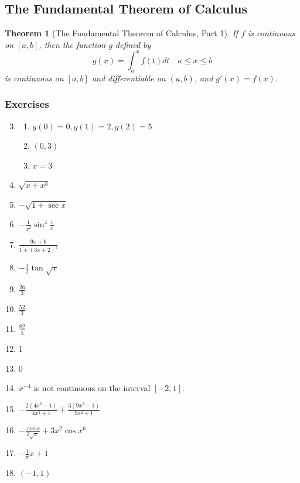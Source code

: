 \documentclass{article} \usepackage[margin=1in]{geometry}
\newtheorem*{theorem*}{Theorem}
\begin{document}
\subsection{The Fundamental Theorem of Calculus}
\begin{theorem*}[The Fundamental Theorem of Calculus, Part 1]
	If $f$ is continuous on $[a, b]$, then the function $g$ defined by
	\[g(x)=\int_{a}^{x}f(t)dt \hspace{1em} a\le x\le b\] is continuous
	on $[a, b]$ and differentiable on $(a, b)$, and $g'(x)=f(x)$.
\end{theorem*}
\subsubsection*{Exercises}
\begin{enumerate}
	\setcounter{enumi}{2}
	\item
	      \begin{enumerate}
		      \item $g(0)=0,g(1)=2,g(2)=5$
		      \item $(0, 3)$
		      \item $x=3$
	      \end{enumerate}
	      \setcounter{enumi}{6}
	\item $\sqrt{x+x^3}$ \setcounter{enumi}{10}
	\item $-\sqrt{1+\sec{x}}$ \setcounter{enumi}{12}
	\item $-\frac{1}{x^2}\sin^4\frac{1}{x}$ \setcounter{enumi}{14}
	\item $\frac{9x+6}{1+(3x+2)^3}$ \setcounter{enumi}{16}
	\item $-\frac{1}{2}\tan\sqrt{x}$ \setcounter{enumi}{18}
	\item $\frac{26}{3}$ \setcounter{enumi}{20}
	\item $\frac{52}{3}$ \setcounter{enumi}{28}
	\item $\frac{82}{5}$ \setcounter{enumi}{30}
	\item 1 \setcounter{enumi}{36}
	\item 0 \setcounter{enumi}{48}
	\item $x^{-4}$ is not continuous on the interval $[-2, 1]$.
	      \setcounter{enumi}{52}
	\item $-\frac{2(4x^2-1)}{4x^2+1}+\frac{3(9x^2-1)}{9x^2+1}$
	      \setcounter{enumi}{54}
	\item $-\frac{\cos{x}}{2\sqrt{x}}+3x^2\cos{x^6}$
	      \setcounter{enumi}{56}
	\item $-\frac{1}{\pi}x+1$
	\item $(-1,1)$

\end{enumerate}
\end{document}
